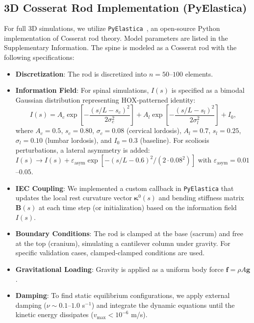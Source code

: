 \documentclass[11pt]{article}
\begin{document}
\subsection{3D Cosserat Rod Implementation (PyElastica)}

For full 3D simulations, we utilize \texttt{PyElastica}~\cite{pyelastica_zenodo,gazzola2018forward}, an open-source Python implementation of Cosserat rod theory. Model parameters are listed in the Supplementary Information. The spine is modeled as a Cosserat rod with the following specifications:

\begin{itemize}
    \item \textbf{Discretization}: The rod is discretized into $n=50$--$100$ elements.
    \item \textbf{Information Field}: For spinal simulations, $I(s)$ is specified as a bimodal Gaussian distribution representing HOX-patterned identity:
    \begin{equation}
    I(s) = A_c \exp\left[-\frac{(s/L - s_c)^2}{2\sigma_c^2}\right] + A_l \exp\left[-\frac{(s/L - s_l)^2}{2\sigma_l^2}\right] + I_0,
    \label{eq:info_field_spinal}
    \end{equation}
    where $A_c = 0.5$, $s_c = 0.80$, $\sigma_c = 0.08$ (cervical lordosis), $A_l = 0.7$, $s_l = 0.25$, $\sigma_l = 0.10$ (lumbar lordosis), and $I_0 = 0.3$ (baseline). For scoliosis perturbations, a lateral asymmetry is added: $I(s) \to I(s) + \varepsilon_{\mathrm{asym}} \exp[-(s/L - 0.6)^2/(2 \cdot 0.08^2)]$ with $\varepsilon_{\mathrm{asym}} = 0.01$--$0.05$.
    \item \textbf{IEC Coupling}: We implemented a custom callback in \texttt{PyElastica} that updates the local rest curvature vector $\bm{\kappa}^0(s)$ and bending stiffness matrix $\mathbf{B}(s)$ at each time step (or initialization) based on the information field $I(s)$.
    \item \textbf{Boundary Conditions}: The rod is clamped at the base (sacrum) and free at the top (cranium), simulating a cantilever column under gravity. For specific validation cases, clamped-clamped conditions are used.
    \item \textbf{Gravitational Loading}: Gravity is applied as a uniform body force $\mathbf{f} = \rho A \mathbf{g}$.
    \item \textbf{Damping}: To find static equilibrium configurations, we apply external damping ($\nu \sim 0.1$--$1.0$ s$^{-1}$) and integrate the dynamic equations until the kinetic energy dissipates ($v_{\max} < 10^{-6}$ m/s).
\end{itemize}
\end{document}
